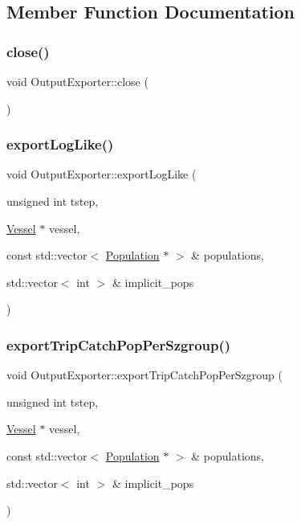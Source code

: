 \subsection{Member Function Documentation}
\mbox{\label{class_output_exporter_a37f5173ec97f4745bb88212acb3d8ab6}} 
\subsubsection{\texorpdfstring{close()}{close()}}
{\footnotesize\ttfamily void Output\+Exporter\+::close (\begin{DoxyParamCaption}{ }\end{DoxyParamCaption})}

\mbox{\label{class_output_exporter_adee23d0c132a6b245e30a20816c6f8c0}} 
\subsubsection{\texorpdfstring{exportLogLike()}{exportLogLike()}}
{\footnotesize\ttfamily void Output\+Exporter\+::export\+Log\+Like (\begin{DoxyParamCaption}\item[{unsigned int}]{tstep,  }\item[{\mbox{\hyperlink{class_vessel}{Vessel}} $\ast$}]{vessel,  }\item[{const std\+::vector$<$ \mbox{\hyperlink{class_population}{Population}} $\ast$ $>$ \&}]{populations,  }\item[{std\+::vector$<$ int $>$ \&}]{implicit\+\_\+pops }\end{DoxyParamCaption})}

\mbox{\label{class_output_exporter_a0f2597e953d3a28ff1bb721b800fdd8a}} 
\subsubsection{\texorpdfstring{exportTripCatchPopPerSzgroup()}{exportTripCatchPopPerSzgroup()}}
{\footnotesize\ttfamily void Output\+Exporter\+::export\+Trip\+Catch\+Pop\+Per\+Szgroup (\begin{DoxyParamCaption}\item[{unsigned int}]{tstep,  }\item[{\mbox{\hyperlink{class_vessel}{Vessel}} $\ast$}]{vessel,  }\item[{const std\+::vector$<$ \mbox{\hyperlink{class_population}{Population}} $\ast$ $>$ \&}]{populations,  }\item[{std\+::vector$<$ int $>$ \&}]{implicit\+\_\+pops }\end{DoxyParamCaption})}

